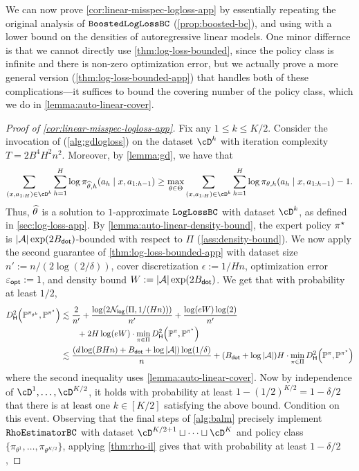 We can now prove \cref{cor:linear-misspec-logloss-app} by essentially repeating the original analysis of $\texttt{BoostedLogLossBC}$ (\cref{prop:boosted-bc}), and using with a lower bound on the densities of autoregressive linear models. One minor differnce is that we cannot directly use \cref{thm:log-loss-bounded}, since the policy class is infinite and there is non-zero optimization error, but we actually prove a more general version (\cref{thm:log-loss-bounded-app}) that handles both of these complications---it suffices to bound the covering number of the policy class, which we do in \cref{lemma:auto-linear-cover}.
\vspace{1em}

\begin{proof}[Proof of \cref{cor:linear-misspec-logloss-app}]
Fix any $1 \leq k \leq K/2$. Consider the invocation of \GDALM (\cref{alg:gdlogloss}) on the dataset $\cD^k$ with iteration complexity $T = 2B^4 H^2 n^2$. Moreover, by \cref{lemma:gd}, we have that
\[\sum_{(x,a_{1:H})\in\cD^k} \sum_{h=1}^H \log \pi_{\thetahat,h}(a_h\mid{}x,a_{1:h-1}) \geq \max_{\theta\in\Theta}\sum_{(x,a_{1:H})\in\cD^k}\sum_{h=1}^H \log \pi_{\theta,h}(a_h\mid{}x,a_{1:h-1}) - 1.\]
Thus, $\widehat{\theta}$ is a solution to $1$-approximate $\texttt{LogLossBC}$ with dataset $\cD^k$, as defined in \cref{sec:log-loss-app}. By \cref{lemma:auto-linear-density-bound}, the expert policy $\pi^{\star}$ is $|\mathcal{A}|\exp(2B_{\mathsf{dot}})$-bounded with respect to $\Pi$ (\cref{ass:density-bound}). We now apply the second guarantee of \cref{thm:log-loss-bounded-app} with dataset size $n' := n/(2\log(2/\delta))$, cover discretization $\epsilon := 1/Hn$, optimization error $\varepsilon_{\mathsf{opt}} := 1$, and density bound $W := |\mathcal{A}|\exp(2B_{\mathsf{dot}})$. We get that with probability at least $1/2$,
\begin{align}
\Dhels{\BP^{\pi_{\theta^k}}}{\BP^{\pistar}} &\lesssim \frac{2}{n'} + \frac{\log(2\Nlog(\Pi,1/(Hn)))}{n'} + \frac{\log(e\denbound)\log(2)}{n'} \\
&\qquad+ 2H\log(e\denbound) \cdot \min_{\pi\in\Pi} \Dhels{\BP^\pi}{\BP^{\pistar}} \\ 
&\lesssim \frac{(d\log(BHn) + \Bdot + \log|\MA|)\log(1/\delta)}{n} + (\Bdot+\log|\MA|)H \cdot \min_{\pi\in\Pi} \Dhels{\BP^\pi}{\BP^{\pistar}}
\end{align}
where the second inequality uses \cref{lemma:auto-linear-cover}. Now by independence of $\cD^1,\dots,\cD^{K/2}$, it holds with probability at least $1 - (1/2)^{K/2} = 1-\delta/2$ that there is at least one $k \in [K/2]$ satisfying the above bound. Condition on this event. Observing that the final steps of \cref{alg:balm} precisely implement $\texttt{RhoEstimatorBC}$ with dataset $\cD^{K/2+1}\sqcup\dots\sqcup\cD^K$ and policy class $\{\pi_{\theta^1},\dots,\pi_{\theta^{K/2}}\}$, applying \cref{thm:rho-il} gives that with probability at least $1-\delta/2$,

\end{proof}
